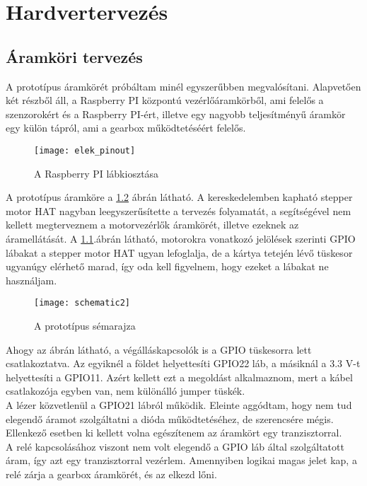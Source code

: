 \chapter{Hardvertervezés}

\section{Áramköri tervezés}
A prototípus áramkörét próbáltam minél egyszerűbben megvalósítani. Alapvetően két részből áll, a Raspberry PI központú vezérlőáramkörből, ami felelős a szenzorokért és a Raspberry PI-ért, illetve egy nagyobb teljesítményű áramkör egy külön tápról, ami a gearbox működtetéséért felelős.


\begin{figure}[h!]
	\centering
	\texttt{[image: elek\_pinout]}
	\caption{A Raspberry PI lábkiosztása \cite{raspberry4}}
	\label{fig:elek_pinout}
\end{figure}


A prototípus áramköre a \ref{fig:schematic} ábrán látható. A kereskedelemben kapható stepper motor HAT nagyban leegyszerűsítette a tervezés folyamatát, a segítségével nem kellett megterveznem a motorvezérlők áramkörét, illetve ezeknek az áramellátását. A \ref{fig:elek_pinout}.ábrán látható, motorokra vonatkozó jelölések szerinti GPIO lábakat a stepper motor HAT ugyan lefoglalja, de a kártya tetején lévő tüskesor ugyanúgy elérhető marad, így oda kell figyelnem, hogy ezeket a lábakat ne használjam. \\

\begin{figure}[h!]
	\centering
	\texttt{[image: schematic2]}
	\caption{A prototípus sémarajza}
	\label{fig:schematic}
\end{figure}

Ahogy az ábrán látható, a végálláskapcsolók is a GPIO tüskesorra lett csatlakoztatva. Az egyiknél a földet helyettesíti GPIO22 láb, a másiknál a 3.3 V-t helyettesíti a GPIO11. Azért kellett ezt a megoldást alkalmaznom, mert a kábel csatlakozója egyben van, nem különálló jumper tüskék.\\

A lézer közvetlenül a GPIO21 lábról működik. Eleinte aggódtam, hogy nem tud elegendő áramot szolgáltatni a dióda működtetéséhez, de szerencsére mégis. Ellenkező esetben ki kellett volna egészítenem az áramkört egy tranzisztorral. \\

A relé kapcsolásához viszont nem volt elegendő a GPIO láb által szolgáltatott áram, így azt egy tranzisztorral vezérlem. Amennyiben logikai magas jelet kap, a relé zárja a gearbox áramkörét, és az elkezd lőni.

